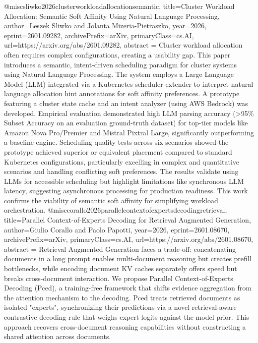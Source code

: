 {}@misc{sliwko2026clusterworkloadallocationsemantic,
      title={Cluster Workload Allocation: Semantic Soft Affinity Using Natural Language Processing}, 
      author={Leszek Sliwko and Jolanta Mizeria-Pietraszko},
      year={2026},
      eprint={2601.09282},
      archivePrefix={arXiv},
      primaryClass={cs.AI},
      url={https://arxiv.org/abs/2601.09282},
      abstract = {Cluster workload allocation often requires complex configurations, creating a usability gap. This paper introduces a semantic, intent-driven scheduling paradigm for cluster systems using Natural Language Processing. The system employs a Large Language Model (LLM) integrated via a Kubernetes scheduler extender to interpret natural language allocation hint annotations for soft affinity preferences. A prototype featuring a cluster state cache and an intent analyzer (using AWS Bedrock) was developed. Empirical evaluation demonstrated high LLM parsing accuracy (>95\% Subset Accuracy on an evaluation ground-truth dataset) for top-tier models like Amazon Nova Pro/Premier and Mistral Pixtral Large, significantly outperforming a baseline engine. Scheduling quality tests across six scenarios showed the prototype achieved superior or equivalent placement compared to standard Kubernetes configurations, particularly excelling in complex and quantitative scenarios and handling conflicting soft preferences. The results validate using LLMs for accessible scheduling but highlight limitations like synchronous LLM latency, suggesting asynchronous processing for production readiness. This work confirms the viability of semantic soft affinity for simplifying workload orchestration.}
}@misc{corallo2026parallelcontextofexpertsdecodingretrieval,
      title={Parallel Context-of-Experts Decoding for Retrieval Augmented Generation}, 
      author={Giulio Corallo and Paolo Papotti},
      year={2026},
      eprint={2601.08670},
      archivePrefix={arXiv},
      primaryClass={cs.AI},
      url={https://arxiv.org/abs/2601.08670},
      abstract = {Retrieval Augmented Generation faces a trade-off: concatenating documents in a long prompt enables multi-document reasoning but creates prefill bottlenecks, while encoding document KV caches separately offers speed but breaks cross-document interaction. We propose Parallel Context-of-Experts Decoding (Pced), a training-free framework that shifts evidence aggregation from the attention mechanism to the decoding. Pced treats retrieved documents as isolated "experts", synchronizing their predictions via a novel retrieval-aware contrastive decoding rule that weighs expert logits against the model prior. This approach recovers cross-document reasoning capabilities without constructing a shared attention across documents.}
}
